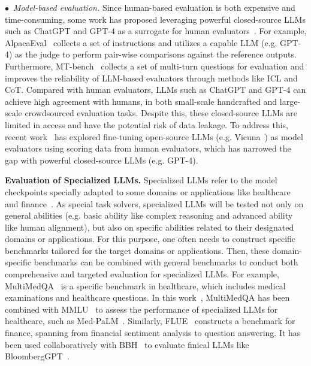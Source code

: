 {{$\bullet$~\emph{Model-based evaluation.} Since human-based evaluation is both expensive and time-consuming, some work has proposed leveraging powerful closed-source LLMs such as ChatGPT and GPT-4 as a surrogate for human evaluators~\cite{Zheng-2023-arxiv-Judging, Li-2023-github-alpaca_eval}. For example, AlpacaEval~\cite{Li-2023-github-alpaca_eval} collects a set of instructions and utilizes a capable LLM (e.g. GPT-4) as the judge to perform pair-wise comparisons against the reference outputs. Furthermore, MT-bench~\cite{Zheng-2023-arxiv-Judging} collects a set of multi-turn questions for evaluation and improves the reliability of LLM-based evaluators through methods like ICL and CoT. Compared with human evaluators, LLMs such as ChatGPT and GPT-4 can achieve high agreement with humans, in both small-scale handcrafted and large-scale crowdsourced evaluation tasks. Despite this, these closed-source LLMs are limited in access and have the potential risk of data leakage. To address this, recent work~\cite{Zheng-2023-arxiv-Judging} has explored fine-tuning open-source LLMs (e.g. Vicuna~\cite{vicuna2023}) as model evaluators using scoring data from human evaluators, which has  narrowed the gap with powerful closed-source LLMs (e.g. GPT-4).

\textbf{Evaluation of Specialized LLMs.} Specialized LLMs refer to the model checkpoints specially adapted to some domains or applications like healthcare~\cite{singhal-arxiv-2022-large} and finance~\cite{Shah-2022-EMNLP-When}. As special task solvers, specialized LLMs will be tested not only on general abilities (e.g. basic ability like complex reasoning and advanced ability like human alignment), but also on specific abilities related to their designated domains or applications. For this purpose, one often needs to construct specific benchmarks tailored for the target domains or applications. Then, these domain-specific benchmarks can be combined with general benchmarks to conduct both comprehensive and targeted evaluation for specialized LLMs. For example, MultiMedQA~\cite{singhal-arxiv-2022-large} is a specific benchmark in healthcare, which includes medical examinations and healthcare questions. In this work~\cite{singhal-arxiv-2022-large}, MultiMedQA has been combined  with MMLU~\cite{Hendrycks-ICLR-2021-Measuring} to assess the performance of specialized LLMs for healthcare, such as Med-PaLM~\cite{singhal-arxiv-2022-large}. Similarly, FLUE~\cite{Shah-2022-EMNLP-When} constructs a benchmark for finance, spanning from financial sentiment analysis to question answering. It has been used collaboratively with BBH~\cite{Suzgun-arxiv-2022-Challenging} to evaluate finical LLMs like BloombergGPT~\cite{wu-arxiv-2023-bloomberggpt}.

}}
